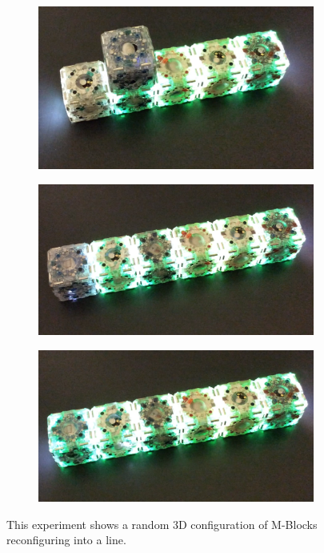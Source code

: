 \begin{figure}[h]
	\begin{subfigure}[b]{0.3\linewidth}
		\includegraphics[width=0.9\linewidth]{figures/ActualLine_4.png}
		\subcaption{} 
	\end{subfigure}
	\begin{subfigure}[b]{0.3\linewidth}
		\includegraphics[width=0.9\linewidth]{figures/ActualLine_5.png}
		\subcaption{} 
	\end{subfigure}
	\begin{subfigure}[b]{0.3\linewidth}
		\includegraphics[width=0.9\linewidth]{figures/ActualLine_6.png}
		\subcaption{} 
	\end{subfigure}
	
	\caption{This experiment shows a random 3D configuration of M-Blocks reconfiguring into a line.}
	
	\label{fig:lineExperiment}
\end{figure}

